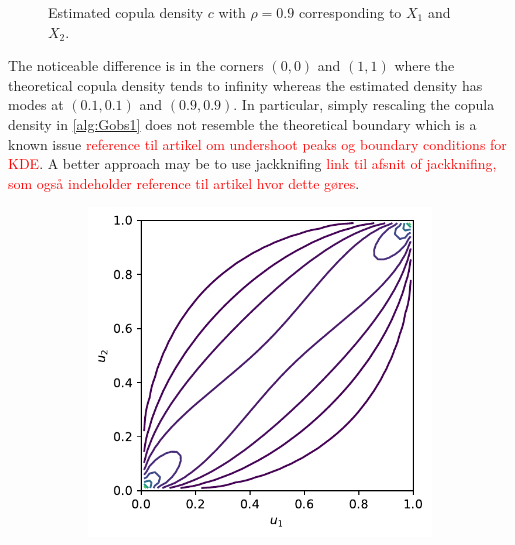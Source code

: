 \documentclass[../Thesis.tex]{subfiles}
\begin{document}
\begin{figure}[H]
\begin{subfigure}[t]{0.5\linewidth}
        \caption{}
    \end{subfigure}
    \caption{Estimated copula density $c$ with $\rho = 0.9$ corresponding to $X_1$ and $X_2$.}
    \label{fig:gaussian copula estimate}
\end{figure}
The noticeable difference is in the corners $(0,0)$ and $(1,1)$ where the theoretical copula density tends to infinity whereas the estimated density has modes at $(0.1,0.1)$ and $(0.9,0.9)$. In particular, simply rescaling the copula density in \autoref{alg:Gobs1} does not resemble the theoretical boundary which is a known issue \textcolor{red}{reference til artikel om undershoot peaks og boundary conditions for KDE}. A better approach may be to use jackknifing \textcolor{red}{link til afsnit of jackknifing, som også indeholder reference til artikel hvor dette gøres}.
\begin{figure}[H]
    \centering
    \begin{subfigure}[t]{0.49\linewidth}
        \centering
        \includegraphics[width = \linewidth]{figures/ND examples/Gaussian copula theoretical contour.pdf}
        \caption{}
    \end{subfigure}%
    ~
    \begin{subfigure}[t]{0.49\linewidth}

\end{subfigure}
\end{figure}
\end{document}
